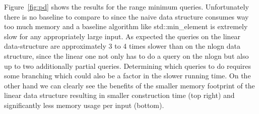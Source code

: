 \documentclass[a4paper,UKenglish,cleveref, autoref, thm-restate]{lipics-v2021}
\begin{document}
Figure~\ref{fig:pd} shows the results for the range minimum queries. Unfortunately there is no baseline to 
compare to since the naive data structure consumes way too much memory and a baseline algorithm like 
std::min\_element is extremely slow for any appropriately large input. As expected the queries on the 
linear data-structure are approximately 3 to 4 times slower than on the nlogn data structure, since the 
linear one not only has to do a query on the nlogn but also up to two additionally partial queries. 
Determining which queries to do requires some branching which could also be a factor in the slower running 
time. On the other hand we can clearly see the benefits of the smaller memory footprint of the linear data 
structure resulting in smaller construction time (top right) and significantly less memory usage per 
input (bottom).




\appendix
\end{document}
